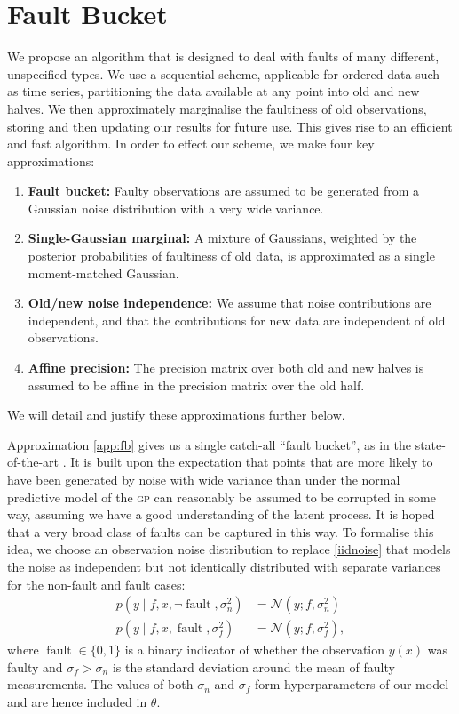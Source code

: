 \documentclass{article} %
\newcommand{\deq}{=}
\newcommand{\given}{\!\ensuremath{\mid}\!}
\newcommand{\cm}[1]{\ensuremath{\mathcal{#1}}}
\newcommand{\acro}[1]{\textsc{\MakeLowercase{#1}}}
\DeclareMathOperator{\fault}{fault}
\begin{document}
\section{Fault Bucket}\label{bucket}

We propose an algorithm that is designed to deal with faults of many different, unspecified types. We use a sequential scheme, applicable for ordered data such as time series, partitioning the data available at any point into old and new halves.  We then approximately marginalise the faultiness of old observations, storing and then updating our results for future use. This gives rise to an efficient and fast algorithm. In order to effect our scheme, we make four key approximations:
\begin{enumerate}
 \item \label{app:fb} {\bf Fault bucket:} Faulty observations are assumed to be generated from a Gaussian noise distribution with a very wide variance.
\item \label{app:single_gaussian} {\bf Single-Gaussian marginal:} A mixture of Gaussians, weighted by the posterior probabilities of faultiness of old data, is approximated as a single moment-matched Gaussian.
\item \label{app:independence} {\bf Old/new noise independence:} We assume that noise contributions are independent, and that the contributions for new data are independent of old observations.
\item \label{app:affine} {\bf Affine precision:} The precision matrix over both old and new halves is assumed to be affine in the precision matrix over the old half.
\end{enumerate}
We will detail and justify these approximations further below.

Approximation \ref{app:fb} gives us a single catch-all ``fault bucket'', as in the state-of-the-art \cite{Dereszynski}. It is built upon the expectation that points that are more likely to have been generated by noise with wide variance than under the normal
predictive model of the \acro{gp} can reasonably be assumed to
be corrupted in some way, assuming we have a good understanding of the
latent process. It is hoped that a very broad class of faults can be
captured in this way. 
To formalise this idea, we choose an observation noise distribution to
replace \eqref{iidnoise} that models the noise as independent
but not identically distributed with separate variances for the
non-fault and fault cases:
\begin{align*}
 p(y \given f, x, \neg\fault, \sigma_n^2)
 &
 \deq
 \cm{N}(y; f, \sigma_n^2)
 \\
 p(y \given f, x, \fault, \sigma_f^2)
 &
 \deq
 \cm{N}(y; f, \sigma_f^2),
\end{align*}
where $\fault \in \lbrace 0, 1 \rbrace$ is a binary indicator of
whether the observation $y(x)$ was faulty and $\sigma_f > \sigma_n$ is
the standard deviation around the mean of faulty measurements.  The
values of both $\sigma_n$ and $\sigma_f$ form hyperparameters of our
model and are hence included in $\theta$.
\end{document}
